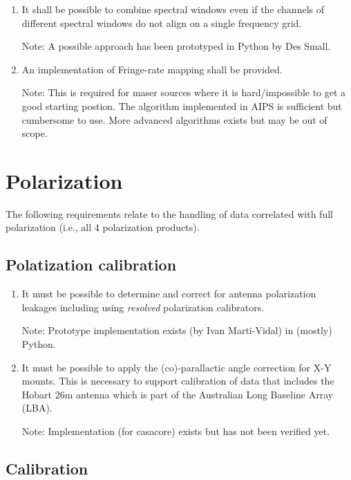 \documentclass[11pt,a4paper]{article}
\begin{document}
\begin{enumerate}[subseclist]
\item It shall be possible to combine spectral windows even if the
  channels of different spectral windows do not align on a single
  frequency grid.

  Note: A possible approach has been prototyped in Python by Des Small.

\item An implementation of Fringe-rate mapping shall be provided.

  Note: This is required for maser sources where it is hard/impossible
  to get a good starting postion.  The algorithm implemented in AIPS
  is sufficient but cumbersome to use.  More advanced algorithms
  exists but may be out of scope.

\end{enumerate}


\section{Polarization}

The following requirements relate to the handling of data correlated
with full polarization (i.e., all 4 polarization products).

\subsection{ Polatization calibration}

\begin{enumerate}[subseclist]

\item It must be possible to determine and correct for antenna
  polarization leakages including using \emph{resolved} polarization
  calibrators.

  Note: Prototype implementation exists (by Ivan Marti-Vidal) in
  (mostly) Python.

\item It must be possible to apply the (co)-parallactic angle
  correction for X-Y mounts.  This is necessary to support calibration
  of data that includes the Hobart 26m antenna which is part of the
  Australian Long Baseline Array (LBA).

  Note: Implementation (for casacore) exists but has not been verified yet.

\end{enumerate}


\subsection{Calibration}
\end{document}
